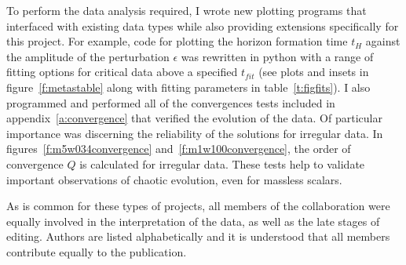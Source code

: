 \documentclass[../PhD.tex]{subfiles}
\begin{document}
To perform the data analysis required, I wrote new plotting programs that interfaced with existing data types while also providing extensions specifically for this project. For example, code for plotting the horizon formation time $t_H$ against the amplitude of the perturbation $\epsilon$ was rewritten in python with a range of fitting options for critical data above a specified $t_{fit}$ (see plots and insets in figure~\ref{f:metastable} along with fitting parameters in table~\ref{t:figfits}). I also programmed and performed all of the convergences tests included in appendix~\ref{a:convergence} that verified the evolution of the data. Of particular importance was discerning the reliability of the solutions for irregular data. In figures~\ref{f:m5w034convergence} and~\ref{f:m1w100convergence}, the order of convergence $Q$ is calculated for irregular data. These tests help to validate important observations of chaotic evolution, even for massless scalars.

As is common for these types of projects, all members of the collaboration were equally involved in the interpretation of the data, as well as the late stages of editing. Authors are listed alphabetically and it is understood that all members contribute equally to the publication.

\newpage

\end{document}
